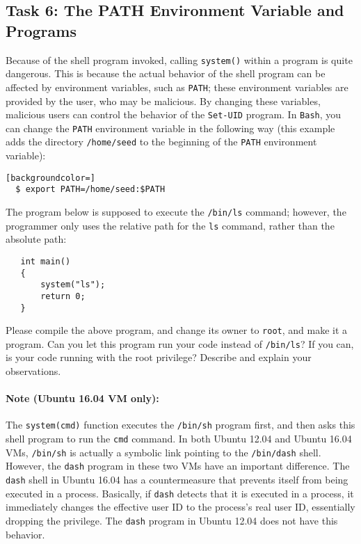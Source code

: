 \subsection{Task 6: The PATH Environment Variable and \setuid Programs}

Because of the shell program invoked, calling {\tt system()} 
within a \setuid program is quite dangerous. This is because the actual behavior of the 
shell program can be affected by environment variables, such
as {\tt PATH}; these environment variables are provided by the user, who 
may be malicious.  By changing these variables, malicious users can control
the behavior of the {\tt Set-UID} program. In {\tt Bash}, you can
change the {\tt PATH} environment variable in the following way (this example 
adds the directory {\tt /home/seed} to the beginning of the {\tt PATH} environment variable):


\begin{lstlisting}[backgroundcolor=]
  $ export PATH=/home/seed:$PATH
\end{lstlisting}



The \setuid program below is supposed to execute the {\tt /bin/ls} command; 
however, the programmer only uses the relative path for the {\tt ls} 
command, rather than the absolute path:

\begin{lstlisting} 
   int main()
   {
       system("ls");
       return 0;
   }
\end{lstlisting}

Please compile the above program, and change its owner to {\tt root}, and 
make it a \setuid program.  Can you let this \setuid program run your code instead of 
{\tt /bin/ls}?  If you can, is your code running with the root privilege?
Describe and explain your observations. \\


\paragraph{Note (Ubuntu 16.04 VM only):} 
The \texttt{system(cmd)} function executes the \texttt{/bin/sh} program first, and then  
asks this shell program to run the \texttt{cmd} command. 
In both Ubuntu 12.04 and Ubuntu 16.04 VMs, \texttt{/bin/sh} is actually 
a symbolic link pointing to the
\texttt{/bin/dash} shell. However, the \texttt{dash} program in these two VMs have an important
difference.  The \texttt{dash} shell in Ubuntu 16.04 has a countermeasure that prevents itself
from being executed in a \setuid process.  Basically, if \texttt{dash} detects that it is
executed in a \setuid process, it immediately changes the effective user ID to the process's
real user ID, essentially dropping the privilege. The \texttt{dash} program in Ubuntu 12.04
does not have this behavior.



